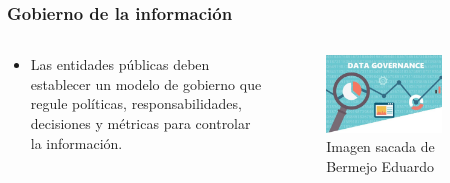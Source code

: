 \begin{frame}[allowframebreaks]

  \frametitle{Gobierno de la información}

  \begin{columns}
    \begin{column}{.5\textwidth}
      \begin{itemize}
        \item Las entidades públicas deben establecer un modelo de gobierno que regule políticas, responsabilidades, decisiones y métricas para controlar la información.
      \end{itemize}  
    \end{column}

    \begin{column}{.5\textwidth}
      \begin{figure}[ht]
        \centering
        \includegraphics[width=0.8\textwidth]{img/GobiernoDatos.jpg}
        \caption{Imagen sacada de Bermejo Eduardo\cite{bermejo2023claves}}
      \end{figure}

    \end{column}
  \end{columns}  


\end{frame}

